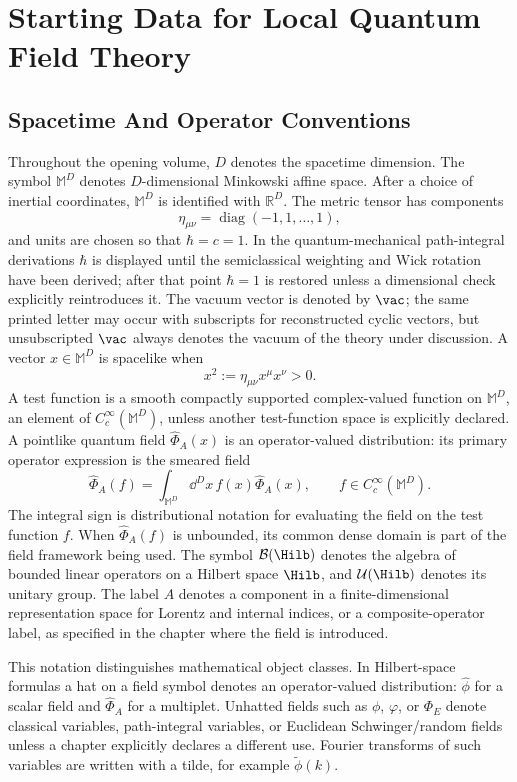 \chapter{Starting Data for Local Quantum Field Theory}
\label{ch:starting-data-local-qft}
\ConventionsMixed


\section{Spacetime And Operator Conventions}

Throughout the opening volume, \(D\) denotes the spacetime dimension. The
symbol \(\mathbb M^D\) denotes \(D\)-dimensional Minkowski affine space. After
a choice of inertial coordinates, \(\mathbb M^D\) is identified with
\(\mathbb R^D\). The metric tensor has components
\[
  \eta_{\mu\nu}=\operatorname{diag}(-1,1,\ldots,1),
\]
and units are chosen so that \(\hbar=c=1\). In the quantum-mechanical
path-integral derivations \(\hbar\) is displayed until the semiclassical
weighting and Wick rotation have been derived; after that point \(\hbar=1\)
is restored unless a dimensional check explicitly reintroduces it.  The
vacuum vector is denoted by \(\vac\); the same printed letter may occur with
subscripts for reconstructed cyclic vectors, but unsubscripted \(\vac\)
always denotes the vacuum of the theory under discussion. A vector
\(x\in\mathbb M^D\) is
spacelike when
\[
  x^2:=\eta_{\mu\nu}x^\mu x^\nu>0.
\]
A test function is a smooth compactly supported complex-valued function on
\(\mathbb M^D\), an element of \(C_c^\infty(\mathbb M^D)\), unless another
test-function space is explicitly declared. A pointlike quantum field
\(\widehat\Phi_A(x)\) is an operator-valued distribution: its primary
operator expression is the smeared field
\[
  \widehat\Phi_A(f)
  =
  \int_{\mathbb M^D}\dd^Dx\,f(x)\widehat\Phi_A(x),
  \qquad
  f\in C_c^\infty(\mathbb M^D).
\]
The integral sign is distributional notation for evaluating the field on the
test function \(f\).  When \(\widehat\Phi_A(f)\) is unbounded, its common dense
domain is part of the field framework being used.  The symbol
\(\mathcal B(\Hilb)\) denotes the algebra of bounded linear operators on a
Hilbert space \(\Hilb\), and \(\mathcal U(\Hilb)\) denotes its unitary group.
The label \(A\) denotes a component in a finite-dimensional representation
space for Lorentz and internal indices, or a composite-operator label, as
specified in the chapter where the field is introduced.

This notation distinguishes mathematical object classes.  In Hilbert-space
formulas a hat on a field symbol denotes an operator-valued distribution:
\(\widehat\phi\) for a scalar field and \(\widehat\Phi_A\) for a multiplet.
Unhatted fields such as \(\phi\), \(\varphi\), or \(\Phi_E\) denote classical
variables, path-integral variables, or Euclidean Schwinger/random fields unless
a chapter explicitly declares a different use.  Fourier transforms of such
variables are written with a tilde, for example \(\widetilde\phi(k)\).

